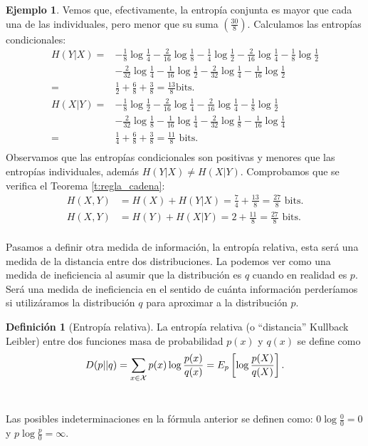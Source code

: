 \documentclass[12pt,a4paper]{report} %
\theoremstyle{definition}
\newtheorem{definition}{Definición}[section]
\newtheorem{example}[theorem]{Ejemplo}
\begin{document}
\begin{example}
  Vemos que, efectivamente, la entropía conjunta es mayor que cada una de las individuales, pero menor que su suma $\left( \frac{30}{8} \right )$. Calculamos las entropías condicionales:
  \begin{align*}
    H(Y|X) = &- \frac{1}{8} \log \frac{1}{4} - \frac{2}{16} \log\frac{1}{8} - \frac{1}{4} \log \frac{1}{2} - \frac{2}{16} \log \frac{1}{4} - \frac{1}{8} \log \frac{1}{2}\\[5pt]
    &- \frac{2}{32} \log \frac{1}{4} - \frac{1}{16} \log \frac{1}{2} - \frac{2}{32} \log \frac{1}{4} - \frac{1}{16} \log \frac{1}{2}\\[5pt]
    =& \frac{1}{2} + \frac{6}{8} + \frac{3}{8} = \frac{13}{8} \text {bits}.\\[10pt]
    H(X|Y) = & - \frac{1}{8} \log \frac{1}{2} - \frac{2}{16} \log \frac{1}{4}- \frac{2}{16} \log \frac{1}{4} - \frac{1}{8} \log \frac{1}{2}\\[5pt]
    &- \frac{2}{32} \log \frac{1}{8} - \frac{1}{16} \log \frac{1}{4} - \frac{2}{32} \log \frac{1}{8} - \frac{1}{16} \log \frac{1}{4}\\[5pt]
    =& \frac{1}{4} + \frac{6}{8} + \frac{3}{8} = \frac{11}{8} \text{ bits}.\\
  \end{align*}
  Observamos que las entropías condicionales son positivas y menores que las entropías individuales, además $H(Y|X) \neq H(X|Y)$. Comprobamos que se verifica el Teorema \ref{t:regla_cadena}:
  \begin{align*}
    H(X,Y) &= H(X) + H(Y|X) = \frac{7}{4} + \frac{13}{8} = \frac{27}{8} \text{ bits}.\\[5pt]
    H(X,Y) &= H(Y) + H(X|Y) = 2 + \frac{11}{8} = \frac{27}{8} \text{ bits}.\\[-5pt]
  \end{align*}
\end{example}

Pasamos a definir otra medida de información, la entropía relativa, esta será una medida de la distancia entre dos distribuciones. La podemos ver como una medida de ineficiencia al asumir que la distribución es $q$ cuando en realidad es $p$. Será una medida de ineficiencia en el sentido de cuánta información perderíamos si utilizáramos la distribución $q$ para aproximar a la distribución $p$.\\

\begin{definition}[Entropía relativa]
  La entropía relativa (o ``distancia'' Kullback Leibler) entre dos funciones masa de probabilidad $p(x)$ y $q(x)$ se define como\[
D(p||q) = \sum_{x \in \mathcal{X}}p(x) \log \frac{p(x)}{q(x)} = \relax{E}_p \left[\log \frac{p(X)}{q(X)}\right].
  \]\\[-10pt]
\end{definition}
Las posibles indeterminaciones en la fórmula anterior se definen como: $0 \log \frac{0}{0} = 0$ y $p \log \frac{p}{0} = \infty$.\\
\end{document}
